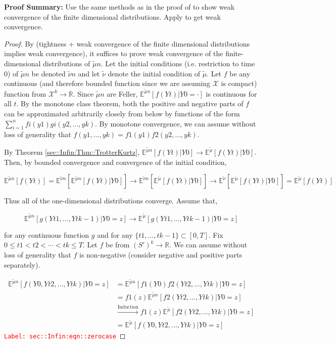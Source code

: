 \documentclass[12pt]{article}
\newcommand{\mb}{\mathbb}
\newcommand{\mc}{\mathcal}
\newcommand{\ra}{\rightarrow}
\newcommand{\os}{\overset}
\newcommand{\te}{\text}
\newcommand{\tr}{\textcolor{red}}
\newcommand{\labe}[1]{\tr{\texttt{Label: #1}}}
\newcommand{\pfsum}{\textbf{Proof Summary: }}
\newcommand{\ind}{\hspace{24pt}}
\newcommand{\exmu}[2]{\mb{E}^{#1}\left[#2\right]}	%
\renewcommand{\t}{t}							%
\newcommand{\alt}[1]{\widetilde{#1}}			%
\newcommand{\m}{\mu}							%
\newcommand{\mm}{\nu}							%
\newcommand{\XX}{Y}								%
\renewcommand{\it}{k}							%
\newcommand{\spce}{\mc{X}}						%
\newcommand{\xx}{y}								%
\begin{document}
\pfsum Use the same methods as in the proof of \cite[Theorem 4.2]{Kur81} to show weak convergence of the finite dimensional distributions. Apply \cite[Theorem 13.1]{Bil99} to get weak convergence.

\begin{proof}
By \cite[Theorem 13.1]{Bil99} (tightness + weak convergence of the finite dimensional distributions implies weak convergence), it suffices to prove weak convergence of the finite-dimensional distributions of \(\alt{\m}{n}\). Let the initial conditions (i.e. restriction to time 0) of \(\alt{\m}{n}\) be denoted \(\alt{\mm}{n}\) and let \(\alt{\mm}\) denote the initial condition of \(\alt{\m}\). Let \(f\) be any continuous (and therefore bounded function since we are assuming \(\spce\) is compact) function from \(\spce^k\ra\mb{R}\). Since \(\alt{\m}{n}\) are Feller, \(\exmu{\alt{\m}{n}}{f(\XX{}{\t})|\XX{}{0} = \cdot}\) is continuous for all \(\t\). By the monotone class theorem, both the positive and negative parts of \(f\) can be approximated arbitrarily closely from below by functions of the form \(\sum_{i=1}^n f{i}(\xx{1})g{i}(\xx{2},\dots,\xx{\it})\). By monotone convergence, we can assume without loss of generality that \(f(\xx{1},\dots,\xx{\it}) = f{1}(\xx{1})f{2}(\xx{2},\dots,\xx{\it})\).

\ind By Theorem \ref{sec::Infin:Thm::TrotterKurtz}, \(\exmu{\alt{\m}{n}}{f(\XX{}{\t})|\XX{}{0}} \ra \exmu{\alt{\m}}{f(\XX{}{\t})|\XX{}{0}}\). Then, by bounded convergence and convergence of the initial condition,

\[\exmu{\alt{\m}{n}}{f(\XX{}{\t})}  = \exmu{\alt{\mm}{n}}{\exmu{\alt{\m}{n}}{f(\XX{}{\t})|\XX{}{0}}} \ra \exmu{\alt{\mm}{n}}{\exmu{\alt{\m}}{f(\XX{}{\t})|\XX{}{0}}} \ra \exmu{\alt{\mm}}{\exmu{\alt{\m}}{f(\XX{}{\t})|\XX{}{0}}} = \exmu{\alt{\m}}{f(\XX{}{\t})}\]

Thus all of the one-dimensional distributions converge. Assume that,

\[\exmu{\alt{\m}{n}}{g(\XX{}{\t{1}},\dots,\XX{}{\t{k-1}})|\XX{}{0}=z} \ra \exmu{\alt{\m}}{g(\XX{}{\t{1}},\dots,\XX{}{\t{k-1}})|\XX{}{0}=z}\]

\noindent for any continuous function \(g\) and for any \(\{\t{1},\dots,\t{k-1}\} \subset [0,T]\). Fix \(0\leq \t{1} <\t{2} <\cdots < \t{\it}\leq T\). Let \(f\) be from \((S')^k \ra \mb{R}\). We can assume without loss of generality that \(f\) is non-negative (consider negative and positive parts separately).

\begin{align}
\exmu{\alt{\m}{n}}{f(\XX{}{0},\XX{}{\t{2}},\dots,\XX{}{\t{\it}})|\XX{}{0} = z}&= \exmu{\alt{\m}{n}}{f{1}(\XX{}{0})f{2}(\XX{}{\t{2}},\dots,\XX{}{\t{k}})|\XX{}{0}=z}\nonumber\\
&= f{1}(z)\exmu{\alt{\m}{n}}{f{2}(\XX{}{\t{2}},\dots,\XX{}{\t{k}})|\XX{}{0}=z}\nonumber\\
&\os{\te{Induction}}{\ra} f{1}(z)\exmu{\alt{\m}}{f{2}(\XX{}{\t{2}},\dots,\XX{}{\t{k}})|\XX{}{0}=z}\nonumber\\
&= \exmu{\alt{\m}}{f(\XX{}{0},\XX{}{\t{2}},\dots,\XX{}{\t{\it}})|\XX{}{0}=z}
\label{sec::Infin:eqn::zerocase}
\end{align}
\labe{sec::Infin:eqn::zerocase}


\end{proof}
\end{document}

